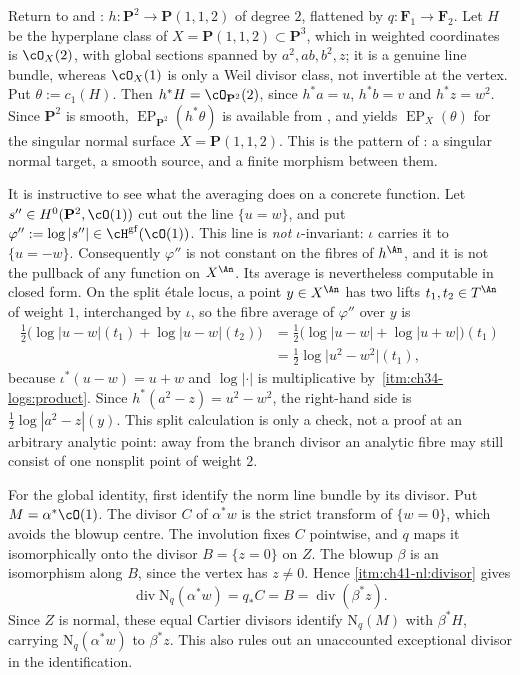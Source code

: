 \begin{example}
\label{ex:ch41-descent-cone}
Return to  and
: $h:\mathbf P^2\to\mathbf P(1,1,2)$ of degree
$2$, flattened by $q:\mathbf F_1\to\mathbf F_2$.  Let
$H$ be the hyperplane class of $X=\mathbf P(1,1,2)\subset\mathbf P^3$,
which in weighted coordinates is $\cO_X(2)$, with global sections spanned
by $a^2,ab,b^2,z$; it is a genuine line bundle, whereas $\cO_X(1)$ is
only a Weil divisor class, not invertible at the vertex.  Put
$\theta:=c_1(H)$.  Then
$h^*H=\cO_{\mathbf P^2}(2)$, since $h^*a=u$, $h^*b=v$ and
$h^*z=w^2$.  Since $\mathbf P^2$ is
smooth, $\operatorname{EP}_{\mathbf P^2}(h^*\theta)$ is available from
, and 
yields $\operatorname{EP}_X(\theta)$ for the singular normal surface
$X=\mathbf P(1,1,2)$.  This is the pattern of
: a singular normal target, a smooth source, and
a finite morphism between them.

It is instructive to see what the averaging does on a concrete function.
Let $s''\in H^0(\mathbf P^2,\cO(1))$ cut out the line
$\{u=w\}$, and put $\varphi'':=\log|s''|\in
\cH^{\mathrm{gf}}(\cO(1))$.  This line is \emph{not} $\iota$-invariant:
$\iota$ carries it to $\{u=-w\}$.  Consequently $\varphi''$ is not
constant on the fibres of $h^{\An}$, and it is not the pullback of any
function on $X^{\An}$.  Its average is nevertheless computable in closed
form.  On the split étale locus, a point $y\in X^{\An}$ has two lifts
$t_1,t_2\in T^{\An}$ of weight $1$, interchanged by $\iota$, so the
fibre average of $\varphi''$ over $y$ is
\[
 \begin{aligned}
 \tfrac12\bigl(\log|u-w|(t_1)+\log|u-w|(t_2)\bigr)
 &=\tfrac12\bigl(\log|u-w|+\log|u+w|\bigr)(t_1)\\
 &=\tfrac12\log\bigl|u^2-w^2\bigr|(t_1),
 \end{aligned}
\]
because $\iota^*(u-w)=u+w$ and $\log|\cdot|$ is multiplicative by
\,\cref{itm:ch34-logs:product}.  Since
$h^*(a^2-z)=u^2-w^2$, the right-hand side is
$\tfrac12\log|a^2-z|(y)$.  This split calculation is only a check, not a
proof at an arbitrary analytic point: away from the branch divisor an
analytic fibre may still consist of one nonsplit point of weight $2$.

For the global identity, first identify the norm line bundle by its
divisor.  Put $M=\alpha^*\cO(1)$.  The divisor $C$ of $\alpha^*w$
is the strict transform of $\{w=0\}$, which avoids the blowup centre.
The involution fixes $C$ pointwise, and $q$ maps it isomorphically
onto the divisor $B=\{z=0\}$ on $Z$.  The blowup $\beta$ is an
isomorphism along $B$, since the vertex has $z\ne0$.  Hence
\cref{itm:ch41-nl:divisor} gives
\[
 \operatorname{div}\mathrm N_q(\alpha^*w)
 =q_*C=B=\operatorname{div}(\beta^*z).
\]
Since $Z$ is normal, these equal Cartier divisors identify
$\mathrm N_q(M)$ with $\beta^*H$, carrying
$\mathrm N_q(\alpha^*w)$ to $\beta^*z$.  This also rules out an
unaccounted exceptional divisor in the identification.


\end{example}
